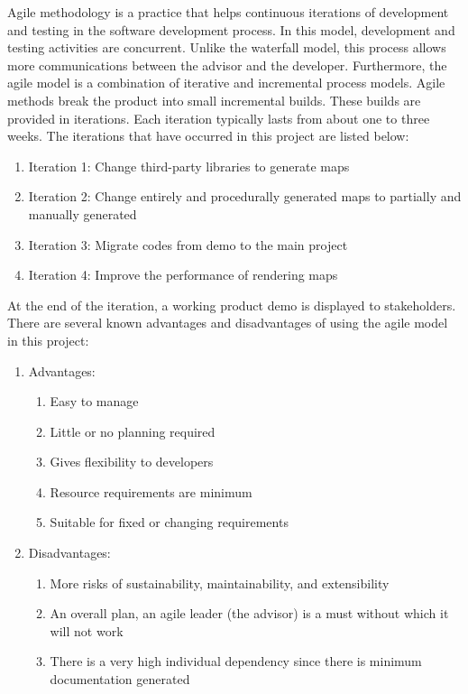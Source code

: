 Agile methodology is a practice that helps continuous iterations of development and testing in the software development process. In this model, development and testing activities are concurrent. Unlike the waterfall model, this process allows more communications between the advisor and the developer. Furthermore, the agile model is a combination of iterative and incremental process models. Agile methods break the product into small incremental builds. These builds are provided in iterations. Each iteration typically lasts from about one to three weeks. The iterations that have occurred in
this project are listed below:
\begin{enumerate}
  \item Iteration 1: Change third-party libraries to generate maps
  \item Iteration 2: Change entirely and procedurally generated maps to partially and manually generated
  \item Iteration 3: Migrate codes from demo to the main project
  \item Iteration 4: Improve the performance of rendering maps
\end{enumerate}
At the end of the iteration, a working product demo is displayed to stakeholders. There are several known advantages and disadvantages of using the agile model in this project:
\begin{enumerate}

  \item Advantages:
  \begin{enumerate}
    \item Easy to manage
    \item Little or no planning required
    \item Gives flexibility to developers
    \item Resource requirements are minimum
    \item Suitable for fixed or changing requirements
  \end{enumerate}

  \item Disadvantages:
  \begin{enumerate}
    \item More risks of sustainability, maintainability, and extensibility
    \item An overall plan, an agile leader (the advisor) is a must without which it will not work
    \item There is a very high individual dependency since there is minimum documentation generated
  \end{enumerate}

\end{enumerate}
